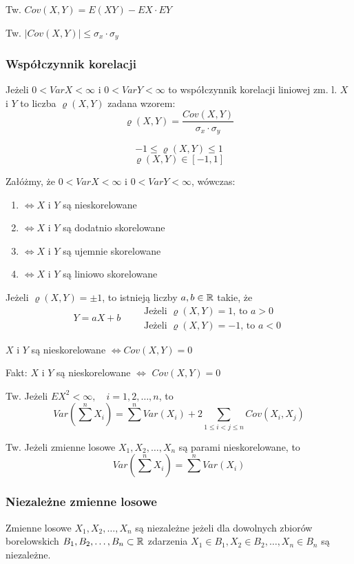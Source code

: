 \documentclass[../Matematyka.tex]{subfiles}
\begin{document}
Tw. \(Cov(X,Y) = E(XY) - EX \cdot EY\)

Tw. \(|Cov(X,Y)| \leq \sigma_x \cdot \sigma_y\)

\subsubsection*{Współczynnik korelacji}
Jeżeli \(0 < VarX < \infty\) i \(0 < VarY < \infty\) to współczynnik korelacji liniowej zm. l. \(X\) i \(Y\) to liczba \(\varrho(X,Y)\) zadana wzorem:
\[\varrho(X,Y) = \frac{Cov(X,Y)}{\sigma_x \cdot \sigma_y}\]

\[-1 \leq \varrho(X,Y) \leq 1\]
\[\varrho(X,Y) \in [-1,1]\]

Załóżmy, że \(0 < VarX < \infty\) i \(0 < VarY < \infty\), wówczas:
\begin{enumerate}[label=(\roman*)]
    \item {} \(\iff X\) i \(Y\) są nieskorelowane
    \item {} \(\iff X\) i \(Y\) są dodatnio skorelowane
    \item {} \(\iff X\) i \(Y\) są ujemnie skorelowane
    \item {} \(\iff X\) i \(Y\) są liniowo skorelowane
\end{enumerate}

Jeżeli \(\varrho(X,Y) = \pm 1\), to istnieją liczby \(a, b \in \mathbb{R}\) takie, że
\[Y = aX + b \qquad 
\substack{
    \text{Jeżeli } \varrho(X,Y) = 1 \text{, to } a > 0\\
    \text{Jeżeli } \varrho(X,Y) = -1 \text{, to } a < 0 
}\]

\(X\) i \(Y\) są nieskorelowane \(\iff Cov(X,Y) = 0\)

Fakt: \(X\) i \(Y\) są nieskorelowane \(\iff\) \(Cov(X,Y) = 0\)

Tw. Jeżeli \(EX^2 < \infty, \quad i = 1, 2, \ldots, n\), to
\[Var(\sum^{n} X_i) = \sum^{n} Var(X_i) + 2 \!\!\!\! \sum_{1 \leq i < j \leq n} \!\!\!\! Cov(X_i, X_j)\]

Tw. Jeżeli zmienne losowe \(X_1, X_2, \ldots, X_n\) są parami nieskorelowane, to
\[Var(\sum^{n} X_i) = \sum^{n} Var(X_i)\]

\subsubsection{Niezależne zmienne losowe}
Zmienne losowe \(X_1, X_2, \ldots, X_n\) są niezależne jeżeli dla dowolnych zbiorów borelowskich \(B_1, B_2, \ldots, B_n \subset \mathbb{R}\) zdarzenia \({X_1 \in B_1}, {X_2 \in B_2}, \ldots, {X_n \in B_n}\) są niezależne.
\end{document}
